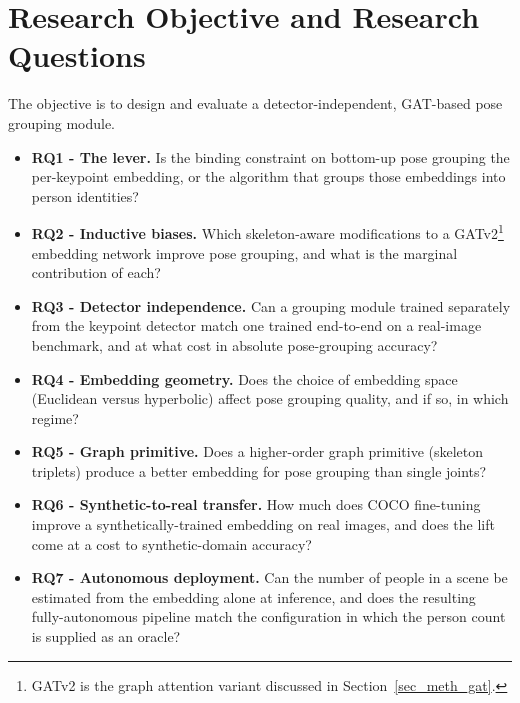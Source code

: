 \section{Research Objective and Research Questions}
\label{sec_intro_objective}

The objective is to design and evaluate a detector-independent, GAT-based pose grouping module.

\begin{itemize}
\item \textbf{RQ1 - The lever.}
Is the binding constraint on bottom-up pose grouping the per-keypoint embedding,
or the algorithm that groups those embeddings into person identities?

\item \textbf{RQ2 - Inductive biases.}
Which skeleton-aware modifications to a GATv2\footnote{GATv2 is the graph
attention variant discussed in Section~\ref{sec_meth_gat}.}~\cite{brody2022gatv2}
embedding network improve pose grouping, and what is the marginal contribution of each?

\item \textbf{RQ3 - Detector independence.}
Can a grouping module trained separately from the keypoint detector match one trained
end-to-end on a real-image benchmark, and at what cost in absolute pose-grouping accuracy?

\item \textbf{RQ4 - Embedding geometry.}
Does the choice of embedding space (Euclidean versus hyperbolic) affect pose grouping quality, and if so, in which regime?

\item \textbf{RQ5 - Graph primitive.}
Does a higher-order graph primitive (skeleton triplets) produce a better embedding for pose grouping than single joints?

\item \textbf{RQ6 - Synthetic-to-real transfer.}
How much does COCO fine-tuning improve a synthetically-trained embedding on real images, and does the 
lift come at a cost to synthetic-domain accuracy?

\item \textbf{RQ7 - Autonomous deployment.}
Can the number of people in a scene be estimated from the embedding alone at inference, and does the 
resulting fully-autonomous pipeline match the configuration in which the person count is supplied as an oracle?
\end{itemize}
